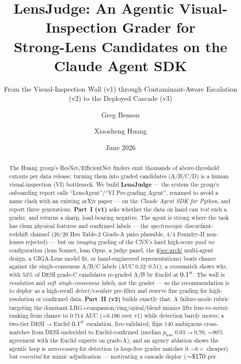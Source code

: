 \documentclass[11pt,letterpaper]{article}
\title{LensJudge: An Agentic Visual-Inspection Grader for\\
       Strong-Lens Candidates on the Claude Agent SDK}
\author{Greg Benson \and Xiaosheng Huang}
\date{June 2026}
\newcommand{\plens}{\ensuremath{p_{\mathrm{lens}}}}
\newcommand{\spectroHsu}{20/20}      %
\newcommand{\spectroNon}{4/4}        %
\newcommand{\vBbenchTwo}{0.714}      %
\newcommand{\vBgain}{0.196}          %
\newcommand{\escN}{140}
\newcommand{\escMedOne}{0.03}\newcommand{\escMedTwo}{0.70} %
\newcommand{\escExpertAgree}{90}     %
\begin{document}
\maketitle
\subtitle{From the Visual-Inspection Wall (v1) through Contaminant-Aware Escalation (v2) to the Deployed Cascade (v3)}

\begin{abstract}
The Huang group's ResNet/EfficientNet finders emit thousands of above-threshold cutouts per
data release; turning them into graded candidates (A/B/C/D) is a human visual-inspection (VI)
bottleneck. We build \textbf{LensJudge} --- the system the group's onboarding report calls
``LensAgent''/``VI Pre-grading Agent'', renamed to avoid a name clash with an existing arXiv
paper --- on the \emph{Claude Agent SDK for Python}, and report three generations.
\textbf{Part~I (v1)} asks whether the data on hand can \emph{test} such a grader, and returns a
sharp, load-bearing negative. The agent is strong where the task has clean physical features
and confirmed labels --- the \emph{spectroscopic} discordant-redshift channel (\spectroHsu{}
Hsu Table-2 Grade-A pairs plausible, \spectroNon{} Foundry-II non-lenses rejected) --- but on
\emph{imaging} grading of the CNN's hard high-score pool \emph{no} configuration (lean Sonnet,
lean Opus, a judge panel, the \S\ref{sec:arch} multi-agent design, a GIGA-Lens model fit, or
hand-engineered representations) beats chance against the single-consensus A/B/C labels (AUC
$0.32$--$0.51$); a crossmatch shows why, with $53\%$ of DESI grade-C candidates re-graded A/B by
Euclid at $0.1^{\prime\prime}$. The wall is \emph{resolution} and \emph{soft single-consensus labels},
not the grader --- so the recommendation is to deploy as a high-recall \emph{detect/escalate}
pre-filter and reserve fine grading for high-resolution or confirmed data.
\textbf{Part~II (v2)} builds exactly that. A failure-mode rubric targeting the dominant
LRG+companion/ring/spiral/blend mimics lifts lens-vs-\emph{mimic} ranking from chance to
$\vBbenchTwo$ AUC ($+\vBgain$ over v1) while detection barely moves; a two-tier DESI$\to$Euclid
$0.1^{\prime\prime}$ escalation, live-validated, flips $\escN$ ambiguous cross-matches from
DESI-undecided to Euclid-confirmed (median \plens{} $\escMedOne\!\to\!\escMedTwo$, ${\sim}\escExpertAgree\%$
agreement with the Euclid experts on grade-A); and an agency ablation shows the agentic loop is
\emph{unnecessary} for detection (a loop-free grader matches it ${\sim}6\times$ cheaper) but
\emph{essential} for mimic adjudication --- motivating a cascade deploy (${\sim}\$170$ per

\end{abstract}
\end{document}
